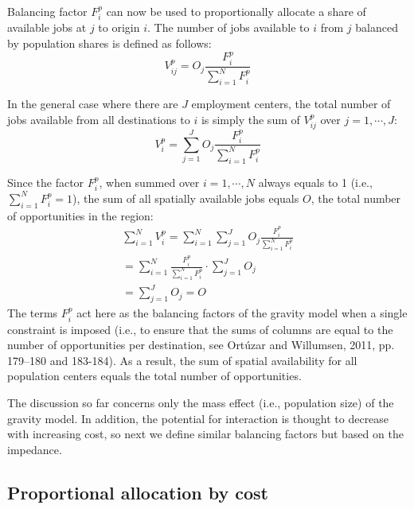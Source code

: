 \documentclass[]{elsarticle} %
\begin{document}
Balancing factor \(F^p_{i}\) can now be used to proportionally allocate
a share of available jobs at \(j\) to origin \(i\). The number of jobs
available to \(i\) from \(j\) balanced by population shares is defined
as follows: \[
V^p_{ij} = O_j\frac{F^p_{i}}{\sum_{i=1}^N F^p_{i}}
\]

In the general case where there are \(J\) employment centers, the total
number of jobs available from all destinations to \(i\) is simply the
sum of \(V^p_{ij}\) over \(j=1,\cdots, J\): \[
V^p_{i} = \sum_{j=1}^J O_j\frac{F^p_{i}}{\sum_{i=1}^N F^p_{i}}
\]

Since the factor \(F^p_{i}\), when summed over \(i=1,\cdots,N\) always
equals to 1 (i.e., \(\sum_{i=1}^{N} F^p_{i} = 1\)), the sum of all
spatially available jobs equals \(O\), the total number of opportunities
in the region: \[
\begin{array}{l}
\sum_{i=1}^N V^p_i =\sum_{i=1}^N\sum_{j=1}^JO_j\frac{F^p_{i}}{\sum_{i=1}^N F^p_{i}}\\
=\sum_{i=1}^N \frac{F^p_{i}}{\sum_{i=1}^N F^p_{i}}\cdot\sum_{j=1}^JO_j\\
=\sum_{j=1}^J O_j = O
\end{array}
\] The terms \(F^p_{i}\) act here as the balancing factors of the
gravity model when a single constraint is imposed (i.e., to ensure that
the sums of columns are equal to the number of opportunities per
destination, see Ortúzar and Willumsen, 2011, pp. 179--180 and 183-184).
As a result, the sum of spatial availability for all population centers
equals the total number of opportunities.

The discussion so far concerns only the mass effect (i.e., population
size) of the gravity model. In addition, the potential for interaction
is thought to decrease with increasing cost, so next we define similar
balancing factors but based on the impedance.

\hypertarget{proportional-allocation-by-cost}{%
\subsection{Proportional allocation by
cost}\label{proportional-allocation-by-cost}}
\end{document}
